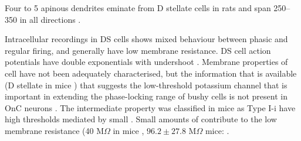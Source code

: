

Four to 5 apinous dendrites eminate from D stellate cells in rats and span 250--350 \um in all directions \citep{DoucetRyugo:1997}.

Intracellular recordings in DS cells shows mixed behaviour between phasic and
regular firing, and generally have low membrane resistance.  DS cell action
potentials have double exponentials with undershoot
\citep{PaoliniClark:1999,WuOertel:1984}.  Membrane properties of \OnC cell have
not been adequately characterised, but the information that is available (D
stellate in mice \citep*{OertelWuEtAl:1990}) that suggests the low-threshold
potassium channel that is important in extending the phase-locking range of
bushy cells \citep{ManisMarx:1991,Oertel:1983} is not present in OnC neurons
\citep{WhiteYoungEtAl:1994}.  The intermediate property was classified in mice
as Type I-i have high thresholds mediated by small \IKLT
\citep{RothmanManis:2003b}.
Small amounts of \IKLT contribute to the low membrane resistance (40 M$\Omega$ in mice \citep*{OertelWuEtAl:1990},  $96.2 \pm 27.8$ M$\Omega$ mice: \citep*{FerragamoGoldingEtAl:1998a}.




